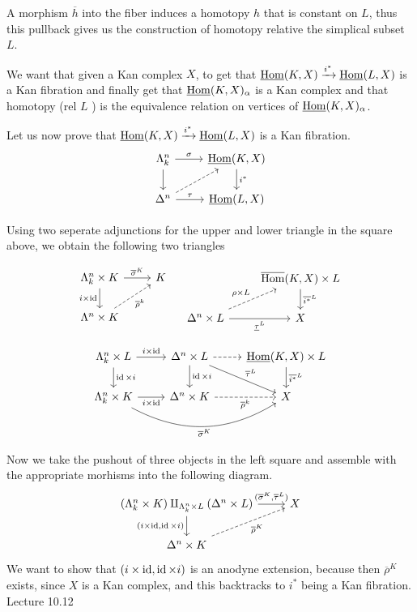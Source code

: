 A morphism $\overline{h}$ into the fiber induces a homotopy $ h $ that is constant on $L$, thus this pullback gives us the construction of homotopy relative the simplical subset $L$.

We want that given a Kan complex $X$, to get that $ \underline{\operatorname{Hom}} ( K , X ) \xrightarrow{i^*} \underline{\operatorname{Hom}} ( L , X ) $ is a Kan fibration and finally get that $ \underline{ \operatorname{Hom} } ( K , X )_{\alpha} $ is a Kan complex and that homotopy (rel $L$ ) is the equivalence relation on vertices of $ \underline{ \operatorname{Hom} } ( K , X )_{\alpha}$.

Let us now prove that $ \underline{\operatorname{Hom}} ( K , X ) \xrightarrow{i^*} \underline{\operatorname{Hom}} ( L , X ) $ is a Kan fibration.
\[
\begin{tikzcd}
	\Lambda_k^n
	\ar[r, " \sigma "]
	\ar[d]
	&
	\underline{\Hom}( K , X )
	\ar[d, " i^*"]
	\\
	\Delta^n
	\ar[r, " \tau "]
	\ar[ru, dashed]
	&
	\underline{\Hom} (  L , X )
\end{tikzcd}
\]

Using two seperate adjunctions for the upper and lower triangle in the square above, we obtain the following two triangles

\[
\begin{tikzcd}
	\Lambda_k^n \times K 
	\ar[r, " \overline{\sigma}^K "]
	\ar[d, " i \times \id "']
	&
	K
	\\
	\Lambda^n \times K
	\ar[ru, dashed, " \overline{ \rho }^k"']
\end{tikzcd}
\quad
\begin{tikzcd}
	& 
	\overline{ \Hom } ( K , X ) \times L 
	\ar[d, " \overline{ i^* }^L "]
	\\
	\Delta^n \times L
	\ar[ru,dashed, " \rho \times L "]
	\ar[r, " \underline{\tau}^L "']
	&
	X
\end{tikzcd}
\]

\[
\begin{tikzcd}
	\Lambda_k^n \times L 
	\ar[r, "i \times \id"]
	\ar[d, " \id \times i "]
	&
	\Delta^n \times L
	\ar[r, dashed]
	\ar[d, "\id \times i"]
	\ar[rd, "\overline{\tau}^L"]
	&
	\underline{ \Hom } ( K , X ) \times L
	\ar[d, " \overline{i^*}^L "]
	\\
	\Lambda^n_k \times K 
	\ar[r, "i \times \id "']
	\ar[rr, bend right, "\overline{\sigma}^K"']
	&
	\Delta^n \times K 
	\ar[r, dashed, "\overline{ \rho}^k "']
	&
	X
\end{tikzcd}
\]

Now we take the pushout of three objects in the left square and assemble with the appropriate morhisms into the following diagram.
\[
\begin{tikzcd}
	( \Lambda_k^n \times K ) \amalg_{\Lambda_k^n \times L} ( \Delta^n \times L )
	\ar[d, " {( i \times \id , \id \times i ) }"']
	\ar[r, " {( \overline{ \sigma }^K , \overline{ \tau }^L )}"]
	&
	X
	\\
	\Delta^n \times K
	\ar[ru, dashed, " \overline{ \rho }^K "']
\end{tikzcd}
\]
We want to show that $ ( i \times \operatorname{id} , \operatorname{id} \times i ) $ is an anodyne extension, because then $ \overline{ \rho }^K $ exists, since $ X $ is a Kan complex, and this backtracks to $i^*$ being a Kan fibration.
Lecture 10.12

